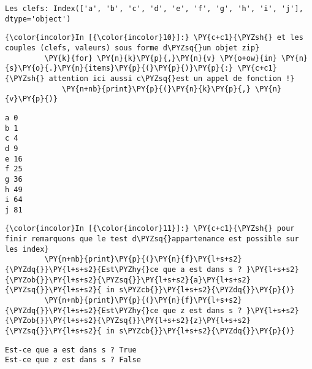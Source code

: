     \begin{Verbatim}[commandchars=\\\{\},frame=single,framerule=0.3mm,rulecolor=\color{cellframecolor}]
Les clefs: Index(['a', 'b', 'c', 'd', 'e', 'f', 'g', 'h', 'i', 'j'], dtype='object')
\end{Verbatim}

    \begin{Verbatim}[commandchars=\\\{\},frame=single,framerule=0.3mm,rulecolor=\color{cellframecolor}]
{\color{incolor}In [{\color{incolor}10}]:} \PY{c+c1}{\PYZsh{} et les couples (clefs, valeurs) sous forme d\PYZsq{}un objet zip}
         \PY{k}{for} \PY{n}{k}\PY{p}{,}\PY{n}{v} \PY{o+ow}{in} \PY{n}{s}\PY{o}{.}\PY{n}{items}\PY{p}{(}\PY{p}{)}\PY{p}{:} \PY{c+c1}{\PYZsh{} attention ici aussi c\PYZsq{}est un appel de fonction !}
             \PY{n+nb}{print}\PY{p}{(}\PY{n}{k}\PY{p}{,} \PY{n}{v}\PY{p}{)}
\end{Verbatim}


    \begin{Verbatim}[commandchars=\\\{\},frame=single,framerule=0.3mm,rulecolor=\color{cellframecolor}]
a 0
b 1
c 4
d 9
e 16
f 25
g 36
h 49
i 64
j 81
\end{Verbatim}

    \begin{Verbatim}[commandchars=\\\{\},frame=single,framerule=0.3mm,rulecolor=\color{cellframecolor}]
{\color{incolor}In [{\color{incolor}11}]:} \PY{c+c1}{\PYZsh{} pour finir remarquons que le test d\PYZsq{}appartenance est possible sur les index}
         \PY{n+nb}{print}\PY{p}{(}\PY{n}{f}\PY{l+s+s2}{\PYZdq{}}\PY{l+s+s2}{Est\PYZhy{}ce que a est dans s ? }\PY{l+s+s2}{\PYZob{}}\PY{l+s+s2}{\PYZsq{}}\PY{l+s+s2}{a}\PY{l+s+s2}{\PYZsq{}}\PY{l+s+s2}{ in s\PYZcb{}}\PY{l+s+s2}{\PYZdq{}}\PY{p}{)}
         \PY{n+nb}{print}\PY{p}{(}\PY{n}{f}\PY{l+s+s2}{\PYZdq{}}\PY{l+s+s2}{Est\PYZhy{}ce que z est dans s ? }\PY{l+s+s2}{\PYZob{}}\PY{l+s+s2}{\PYZsq{}}\PY{l+s+s2}{z}\PY{l+s+s2}{\PYZsq{}}\PY{l+s+s2}{ in s\PYZcb{}}\PY{l+s+s2}{\PYZdq{}}\PY{p}{)}
\end{Verbatim}


    \begin{Verbatim}[commandchars=\\\{\},frame=single,framerule=0.3mm,rulecolor=\color{cellframecolor}]
Est-ce que a est dans s ? True
Est-ce que z est dans s ? False
\end{Verbatim}

